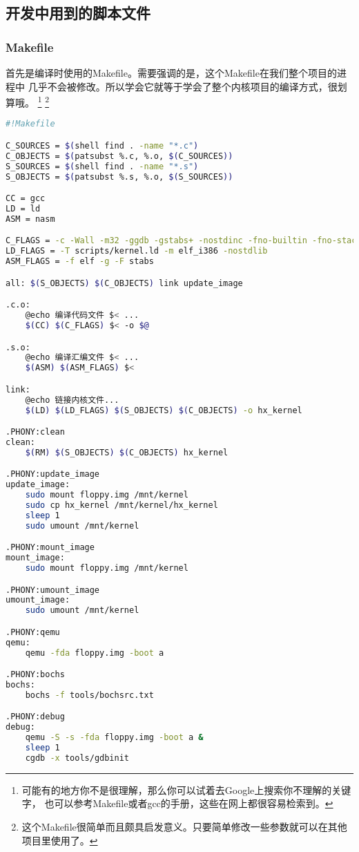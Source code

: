 \subsection{开发中用到的脚本文件}

\subsubsection{Makefile}
\par 首先是编译时使用的Makefile。需要强调的是，这个Makefile在我们整个项目的进程中\allowbreak
几乎不会被修改。所以学会它就等于学会了整个内核项目的编译方式，很划算哦。
\footnote{可能有的地方你不是很理解，那么你可以试着去Google上搜索你不理解的关键字，\allowbreak
也可以参考Makefile或者gcc的手册，这些在网上都很容易检索到。}
\footnote{这个Makefile很简单而且颇具启发意义。只要简单修改一些参数就可以在其他项目里使用了。}

\begin{lstlisting}[language = sh, caption = Makefile]
#!Makefile

C_SOURCES = $(shell find . -name "*.c")
C_OBJECTS = $(patsubst %.c, %.o, $(C_SOURCES))
S_SOURCES = $(shell find . -name "*.s")
S_OBJECTS = $(patsubst %.s, %.o, $(S_SOURCES))

CC = gcc
LD = ld
ASM = nasm

C_FLAGS = -c -Wall -m32 -ggdb -gstabs+ -nostdinc -fno-builtin -fno-stack-protector -I include
LD_FLAGS = -T scripts/kernel.ld -m elf_i386 -nostdlib
ASM_FLAGS = -f elf -g -F stabs

all: $(S_OBJECTS) $(C_OBJECTS) link update_image

.c.o:
	@echo 编译代码文件 $< ...
	$(CC) $(C_FLAGS) $< -o $@

.s.o:
	@echo 编译汇编文件 $< ...
	$(ASM) $(ASM_FLAGS) $<

link:
	@echo 链接内核文件...
	$(LD) $(LD_FLAGS) $(S_OBJECTS) $(C_OBJECTS) -o hx_kernel

.PHONY:clean
clean:
	$(RM) $(S_OBJECTS) $(C_OBJECTS) hx_kernel

.PHONY:update_image
update_image:
	sudo mount floppy.img /mnt/kernel
	sudo cp hx_kernel /mnt/kernel/hx_kernel
	sleep 1
	sudo umount /mnt/kernel

.PHONY:mount_image
mount_image:
	sudo mount floppy.img /mnt/kernel

.PHONY:umount_image
umount_image:
	sudo umount /mnt/kernel

.PHONY:qemu
qemu:
	qemu -fda floppy.img -boot a

.PHONY:bochs
bochs:
	bochs -f tools/bochsrc.txt

.PHONY:debug
debug:
	qemu -S -s -fda floppy.img -boot a &
	sleep 1
	cgdb -x tools/gdbinit

\end{lstlisting} 

